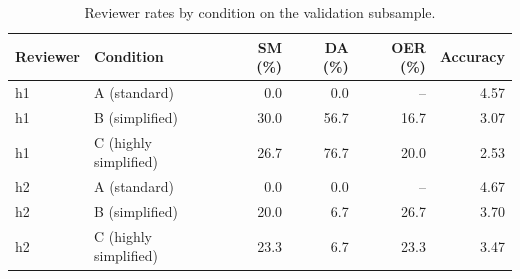 \begin{table}[H]
\caption{Reviewer rates by condition on the validation subsample.}
\label{tab:reviewer:rates}
\centering
\begin{tabular}{llrrrr}
\toprule
Reviewer & Condition & SM (\%) & DA (\%) & OER (\%) & Accuracy \\
\midrule
h1 & A (standard) & 0.0 & 0.0 & -- & 4.57 \\
h1 & B (simplified) & 30.0 & 56.7 & 16.7 & 3.07 \\
h1 & C (highly simplified) & 26.7 & 76.7 & 20.0 & 2.53 \\
h2 & A (standard) & 0.0 & 0.0 & -- & 4.67 \\
h2 & B (simplified) & 20.0 & 6.7 & 26.7 & 3.70 \\
h2 & C (highly simplified) & 23.3 & 6.7 & 23.3 & 3.47 \\
\bottomrule
\end{tabular}
\end{table}
